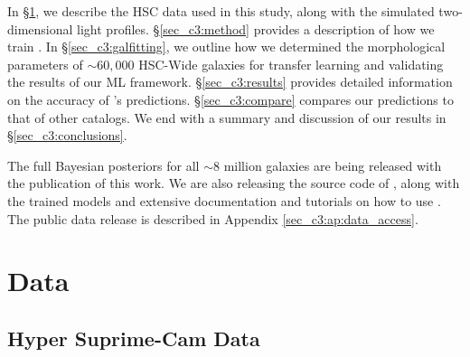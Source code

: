 In \S \ref{sec_c3:data}, we describe the HSC data used in this study, along with the simulated two-dimensional light profiles. \S \ref{sec_c3:method} provides a description of how we train \gampen{}. In \S \ref{sec_c3:galfitting}, we outline how we determined the morphological parameters of $\sim60,000$ HSC-Wide galaxies for transfer learning and validating the results of our ML framework. \S \ref{sec_c3:results} provides detailed information on the accuracy of \gampen{}'s predictions. \S \ref{sec_c3:compare} compares our predictions to that of other catalogs. We end with a summary and discussion of our results in \S \ref{sec_c3:conclusions}.

The full Bayesian posteriors for all $\sim 8$ million galaxies are being released with the publication of this work. We are also releasing the source code of \gampen{}, along with the trained models and extensive documentation and tutorials on how to use \gampen{}. The public data release is described in Appendix \ref{sec_c3:ap:data_access}.

\section{Data} \label{sec_c3:data}

\subsection{Hyper Suprime-Cam Data} \label{sec_c3:hsc_data}

